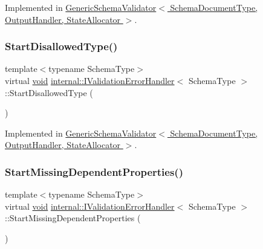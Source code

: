 Implemented in \hyperlink{classGenericSchemaValidator_a767f115cc90e0f2f5bdd1c9fbdbf75df}{Generic\+Schema\+Validator$<$ Schema\+Document\+Type, Output\+Handler, State\+Allocator $>$}.

\mbox{\label{classinternal_1_1IValidationErrorHandler_a994a8b1526a79737b9d7b7575def4f65}} 
\subsubsection{\texorpdfstring{Start\+Disallowed\+Type()}{StartDisallowedType()}}
{\footnotesize\ttfamily template$<$typename Schema\+Type$>$ \\
virtual \hyperlink{imgui__impl__opengl3__loader_8h_ac668e7cffd9e2e9cfee428b9b2f34fa7}{void} \hyperlink{classinternal_1_1IValidationErrorHandler}{internal\+::\+I\+Validation\+Error\+Handler}$<$ Schema\+Type $>$\+::Start\+Disallowed\+Type (\begin{DoxyParamCaption}{ }\end{DoxyParamCaption})\hspace{0.3cm}{\ttfamily [pure virtual]}}



Implemented in \hyperlink{classGenericSchemaValidator_a9904719420fd91200f80772e92fe225f}{Generic\+Schema\+Validator$<$ Schema\+Document\+Type, Output\+Handler, State\+Allocator $>$}.

\mbox{\label{classinternal_1_1IValidationErrorHandler_ae312aea74718dda0411af023c0c78ef6}} 
\subsubsection{\texorpdfstring{Start\+Missing\+Dependent\+Properties()}{StartMissingDependentProperties()}}
{\footnotesize\ttfamily template$<$typename Schema\+Type$>$ \\
virtual \hyperlink{imgui__impl__opengl3__loader_8h_ac668e7cffd9e2e9cfee428b9b2f34fa7}{void} \hyperlink{classinternal_1_1IValidationErrorHandler}{internal\+::\+I\+Validation\+Error\+Handler}$<$ Schema\+Type $>$\+::Start\+Missing\+Dependent\+Properties (\begin{DoxyParamCaption}{ }\end{DoxyParamCaption})\hspace{0.3cm}{\ttfamily [pure virtual]}}



